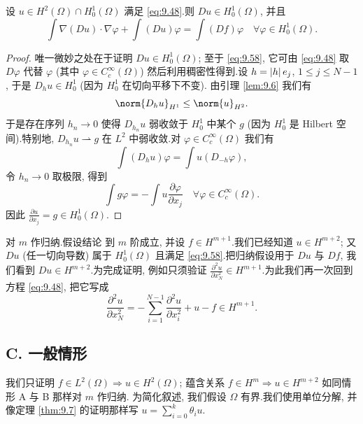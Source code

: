 \begin{lemma}
\label{lem:9.7}
设 $u\in H^2(\Omega)\cap H_0^1(\Omega)$ 满足 \eqref{eq:9.48}.则
$Du\in H_0^1(\Omega)$, 并且
\begin{equation}
\int\nabla(Du)\cdot\nabla\varphi+\int(Du)\varphi=\int(Df)\varphi
\quad\forall\varphi\in H_0^1(\Omega).
\label{eq:9.58}
\end{equation}
\end{lemma}

\begin{proof}
唯一微妙之处在于证明 $Du\in H_0^1(\Omega)$; 至于 \eqref{eq:9.58}, 它可由
\eqref{eq:9.48} 取 $D\varphi$ 代替 $\varphi$ (其中
$\varphi\in C_c^\infty(\Omega)$) 然后利用稠密性得到.设 $h=\left|h\right|e_j$,
$1\le j\le N-1$, 于是 $D_hu\in H_0^1$ (因为 $H_0^1$ 在切向平移下不变).
由引理  \ref{lem:9.6} 我们有
\begin{equation*}
\norm{D_hu}_{H^1}\le\norm{u}_{H^2}.
\end{equation*}
于是存在序列 $h_n\to0$ 使得 $D_{h_n}u$ 弱收敛于 $H_0^1$ 中某个 $g$
(因为 $H_0^1$ 是 Hilbert 空间).特别地, $D_{h_n}u\rightharpoonup g$ 在
$L^2$ 中弱收敛.对 $\varphi\in C_c^\infty(\Omega)$ 我们有
\begin{equation*}
\int(D_hu)\varphi=\int u(D_{-h}\varphi),
\end{equation*}
令 $h_n\to0$ 取极限, 得到
\begin{equation*}
\int g\varphi=-\int u\frac{\partial\varphi}{\partial x_j}
\quad\forall\varphi\in C_c^\infty(\Omega).
\end{equation*}
因此 $\frac{\partial u}{\partial x_j}=g\in H_0^1(\Omega)$.
\end{proof}

 对 $m$ 作归纳.假设结论
到 $m$ 阶成立, 并设 $f\in H^{m+1}$.我们已经知道 $u\in H^{m+2}$; 又 $Du$
(任一切向导数) 属于 $H_0^1(\Omega)$ 且满足 \eqref{eq:9.58}.把归纳假设用于
$Du$ 与 $Df$, 我们看到 $Du\in H^{m+2}$.为完成证明, 例如只须验证
$\frac{\partial^2u}{\partial x_N^2}\in H^{m+1}$.为此我们再一次回到方程
\eqref{eq:9.48}, 把它写成
\begin{equation*}
\frac{\partial^2u}{\partial x_N^2}
=-\sum_{i=1}^{N-1}\frac{\partial^2u}{\partial x_i^2}+u-f\in H^{m+1}.
\end{equation*}

\subsection*{C. 一般情形}

我们只证明 $f\in L^2(\Omega)\Rightarrow u\in H^2(\Omega)$; 蕴含关系
$f\in H^m\Rightarrow u\in H^{m+2}$ 如同情形 A 与 B 那样对 $m$ 作归纳.
为简化叙述, 我们假设 $\Omega$ 有界.我们使用单位分解, 并像定理  \ref{thm:9.7}
的证明那样写 $u=\sum_{i=0}^k\theta_iu$.

